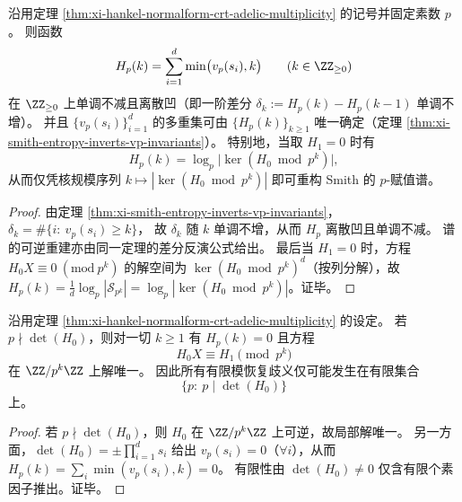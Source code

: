 \begin{proposition}\label{prop:xi-hankel-normalform-hp-discrete-concave-invert}
沿用定理 \ref{thm:xi-hankel-normalform-crt-adelic-multiplicity} 的记号并固定素数 \(p\)。
则函数
\[
H_p(k)=\sum_{i=1}^{d}\min\bigl(v_p(s_i),k\bigr)\qquad(k\in\ZZ_{\ge 0})
\]
在 \(\ZZ_{\ge 0}\) 上单调不减且离散凹（即一阶差分 \(\delta_k:=H_p(k)-H_p(k-1)\) 单调不增）。
并且 \(\{v_p(s_i)\}_{i=1}^{d}\) 的多重集可由 \(\{H_p(k)\}_{k\ge 1}\) 唯一确定（定理 \ref{thm:xi-smith-entropy-inverts-vp-invariants}）。
特别地，当取 \(H_1=0\) 时有
\[
H_p(k)=\log_p\bigl|\ker(H_0\bmod p^k)\bigr|,
\]
从而仅凭核规模序列 \(k\mapsto|\ker(H_0\bmod p^k)|\) 即可重构 Smith 的 \(p\)-赋值谱。
\end{proposition}
\begin{proof}
由定理 \ref{thm:xi-smith-entropy-inverts-vp-invariants}，
\(
\delta_k=\#\{i:\ v_p(s_i)\ge k\}
\)，
故 \(\delta_k\) 随 \(k\) 单调不增，从而 \(H_p\) 离散凹且单调不减。
谱的可逆重建亦由同一定理的差分反演公式给出。
最后当 \(H_1=0\) 时，方程 \(H_0X\equiv 0\ (\mathrm{mod}\ p^k)\) 的解空间为 \(\ker(H_0\bmod p^k)^d\)（按列分解），故
\(
H_p(k)=\frac{1}{d}\log_p|\mathcal S_{p^k}|=\log_p|\ker(H_0\bmod p^k)|
\)。证毕。
\end{proof}

\begin{corollary}\label{cor:xi-hankel-normalform-adelic-ambiguity-finite-support}
沿用定理 \ref{thm:xi-hankel-normalform-crt-adelic-multiplicity} 的设定。
若 \(p\nmid \det(H_0)\)，则对一切 \(k\ge 1\) 有 \(H_p(k)=0\) 且方程
\[
H_0X\equiv H_1\pmod{p^k}
\]
在 \(\ZZ/p^k\ZZ\) 上解唯一。
因此所有有限模恢复歧义仅可能发生在有限集合
\[
\{p:\ p\mid\det(H_0)\}
\]
上。
\end{corollary}
\begin{proof}
若 \(p\nmid \det(H_0)\)，则 \(H_0\) 在 \(\ZZ/p^k\ZZ\) 上可逆，故局部解唯一。
另一方面，\(\det(H_0)=\pm\prod_{i=1}^{d}s_i\) 给出 \(v_p(s_i)=0\)（\(\forall i\)），从而 \(H_p(k)=\sum_i\min(v_p(s_i),k)=0\)。
有限性由 \(\det(H_0)\neq 0\) 仅含有限个素因子推出。证毕。
\end{proof}

